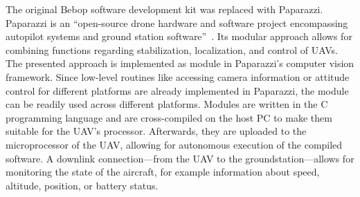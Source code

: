 \documentclass{report}
\begin{document}
The original Bebop software development kit was replaced with
Paparazzi. Paparazzi is an ``open-source drone hardware and software
project encompassing autopilot systems and ground station
software''~\cite{paparazzi}. Its modular approach allows for combining
functions regarding stabilization, localization, and control of UAVs.
The presented approach is implemented as module in Paparazzi's
computer vision framework. Since low-level routines like accessing
camera information or attitude control for different platforms are
already implemented in Paparazzi, the module can be readily used
across different platforms. Modules are written in the C programming
language and are cross-compiled on the host PC to make them suitable
for the UAV's processor. Afterwards, they are uploaded to the
microprocessor of the UAV, allowing for autonomous execution of the
compiled software. A downlink connection---from the UAV to the
groundstation---allows for monitoring the state of the aircraft, for
example information about speed, altitude, position, or battery
status.
\end{document}
